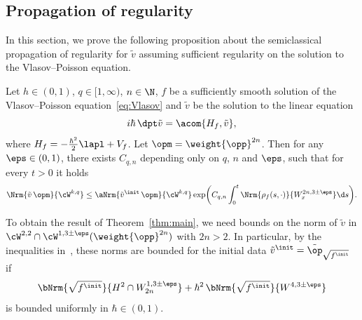 \subsection{Propagation of regularity}

In this section, we prove the following proposition about the semiclassical propagation of regularity for $\tilde{v}$ assuming sufficient regularity on the solution to the Vlasov--Poisson equation.
\begin{prop}\label{prop:propagation_regularity}
Let $h\in(0,1)$, $q\in[1,\infty)$, $n\in\N$, $f$ be a sufficiently smooth solution of the Vlasov--Poisson equation~\eqref{eq:Vlasov} and $\tilde{v}$ be the solution to the linear equation\vspace*{-3pt}
\begin{equation*}
i \hbar\,\dpt \tilde{v} = \acom{H_f, \tilde{v}},
\end{equation*}
where $H_f = -\tfrac{\hbar^2}{2}\lapl + V_f$. Let $\opm = \weight{\opp}^{2n}$. Then for any $\eps\in(0,1)$, there exists $C_{q,n}$ depending only on $q$, $n$ and $\eps$, such that for every $t>0$ it holds\vspace*{-3pt}
\begin{equation*}
\Nrm{\tilde{v}\, \opm}{\cW^{k, q}} \le \aNrm{\tilde{v}^\init\, \opm}{\cW^{k, q}} \exp \biggl(C_{q,n} \int^t_0 \Nrm{\rho_f(s,\cdot)}{W_x^{2n,3\pm\eps}} \d s\biggr).
\end{equation*}
\end{prop}

\begin{remark}
To obtain the result of Theorem~\ref{thm:main}, we need bounds on the norm of $\tilde{v}$ in $\cW^{2,2}\cap \cW^{1,3\pm\eps}(\weight{\opp}^{2n})$ with $2n>2$. In particular, by the inequalities in~\cite{lafleche_strong_2021}, these norms are bounded for the initial data $\tilde{v}^\init = \tilde{\op}_{\sqrt{f^\init}}$ if
\begin{equation*}
\bNrm{\sqrt{f^\init}}{H^2\cap W^{1,3\pm\eps}_{2n}} +
\hbar^2\, \bNrm{\sqrt{f^\init}}{W^{4,3\pm\eps}}
\end{equation*}
is bounded uniformly in ${\hbar\in(0,1)}$.
\end{remark}

